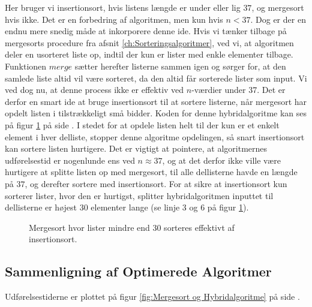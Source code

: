 Her bruger vi insertionsort, hvis listens længde er under eller lig $37$, og mergesort hvis ikke. Det er en forbedring af algoritmen, men kun hvis $n < 37$. Dog er der en endnu mere snedig måde at inkorporere denne ide. Hvis vi tænker tilbage på mergesorts procedure fra afsnit \ref{ch:Sorteringsalgoritmer}, ved vi, at algoritmen deler en usorteret liste op, indtil der kun er lister med enkle elementer tilbage. Funktionen $merge$ sætter herefter listerne sammen igen og sørger for, at den samlede liste altid vil være sorteret, da den altid får sorterede lister som input. Vi ved dog nu, at denne process ikke er effektiv ved $n$-værdier under 37. Det er derfor en smart ide at bruge insertionsort til at sortere listerne, når mergesort har opdelt listen i tilstrækkeligt små bidder. Koden for denne hybridalgoritme kan ses på figur \ref{fig:hybridalgoritme i Python} på side \pageref{fig:hybridalgoritme i Python}. I stedet for at opdele listen helt til der kun er et enkelt element i hver delliste, stopper denne algoritme opdelingen, så snart insertionsort kan sortere listen hurtigere. Det er vigtigt at pointere, at algoritmernes udførelsestid er nogenlunde ens ved $n \approx 37$, og at det derfor ikke ville være hurtigere at splitte listen op med mergesort, til alle dellisterne havde en længde på $37$, og derefter sortere med insertionsort. For at sikre at insertionsort kun sorterer lister, hvor den er hurtigst, splitter hybridalgoritmen inputtet til dellisterne er højest $30$ elementer lange (se linje 3 og 6 på figur \ref{fig:hybridalgoritme i Python}).



\begin{figure}
	\begin{center}
		
	\end{center}
	\caption{Mergesort hvor lister mindre end 30 sorteres effektivt af insertionsort.}
	\label{fig:hybridalgoritme i Python}
\end{figure}




\subsection{Sammenligning af Optimerede Algoritmer}%
\label{sub:Sammenligning af Optimerede Algoritmer}

Udførelsestiderne er plottet på figur \ref{fig:Mergesort og Hybridalgoritme} på side \pageref{fig:Mergesort og Hybridalgoritme}.\\

